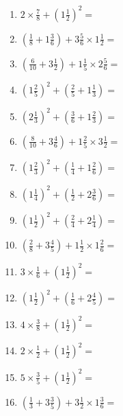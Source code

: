 \documentclass[12pt]{article}
\begin{document}
\begin{enumerate}
\newpage
\item \large $ 2 \times \frac{7}{8} + (1 \frac{1}{2})^2 = $ \vspace{1.8cm}
\item \large $ (\frac{1}{8} + 1 \frac{3}{6}) + 3 \frac{5}{6} \times 1 \frac{1}{2} = $ \vspace{1.8cm}
\item \large $ (\frac{6}{10} + 3 \frac{1}{2}) + 1 \frac{1}{5} \times 2 \frac{5}{6} = $ \vspace{1.8cm}
\item \large $ (1 \frac{2}{5})^2 + (\frac{2}{5} + 1 \frac{1}{3}) = $ \vspace{1.8cm}
\item \large $ (2 \frac{1}{3})^2 + (\frac{3}{6} + 1 \frac{2}{3}) = $ \vspace{1.8cm}
\item \large $ (\frac{8}{10} + 3 \frac{4}{6}) + 1 \frac{2}{5} \times 3 \frac{1}{2} = $ \vspace{1.8cm}
\item \large $ (1 \frac{2}{3})^2 + (\frac{1}{4} + 1 \frac{2}{6}) = $ \vspace{1.8cm}
\item \large $ (1 \frac{1}{4})^2 + (\frac{1}{2} + 2 \frac{3}{6}) = $ \vspace{1.8cm}
\item \large $ (1 \frac{1}{2})^2 + (\frac{2}{4} + 2 \frac{1}{4}) = $ \vspace{1.8cm}
\item \large $ (\frac{2}{8} + 3 \frac{4}{5}) + 1 \frac{1}{2} \times 1 \frac{2}{6} = $ \vspace{1.8cm}
\newpage
\item \large $ 3 \times \frac{1}{6} + (1 \frac{1}{2})^2 = $ \vspace{1.8cm}
\item \large $ (1 \frac{1}{2})^2 + (\frac{1}{6} + 2 \frac{4}{5}) = $ \vspace{1.8cm}
\item \large $ 4 \times \frac{3}{8} + (1 \frac{1}{2})^2 = $ \vspace{1.8cm}
\item \large $ 2 \times \frac{1}{2} + (1 \frac{1}{2})^2 = $ \vspace{1.8cm}
\item \large $ 5 \times \frac{3}{5} + (1 \frac{1}{2})^2 = $ \vspace{1.8cm}
\item \large $ (\frac{1}{3} + 3 \frac{3}{5}) + 3 \frac{1}{2} \times 1 \frac{3}{6} = $ \vspace{1.8cm}

\end{enumerate}
\end{document}
